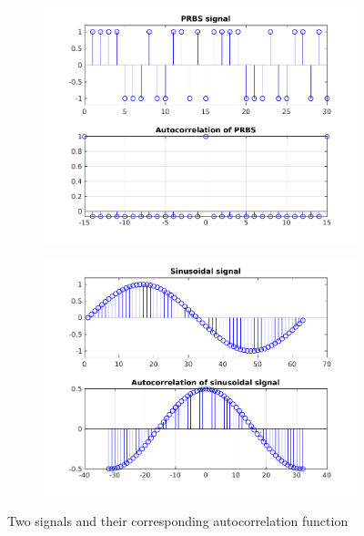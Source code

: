 \documentclass{scrartcl}
\begin{document}
\begin{figure}[h]
	\centering
	\begin{subfigure}{0.49\textwidth}
		\includegraphics[width=\textwidth]{figures/prbs.pdf}
		\label{fig:autocorrPRBS}
	\end{subfigure}
	\begin{subfigure}{0.49\textwidth}
		\includegraphics[width=\textwidth]{figures/sine.pdf}
		\label{fig:autocorrSINUS}
	\end{subfigure}
	\caption{Two signals and their corresponding autocorrelation function}\label{fig:autocorr}
\end{figure}
\end{document}
